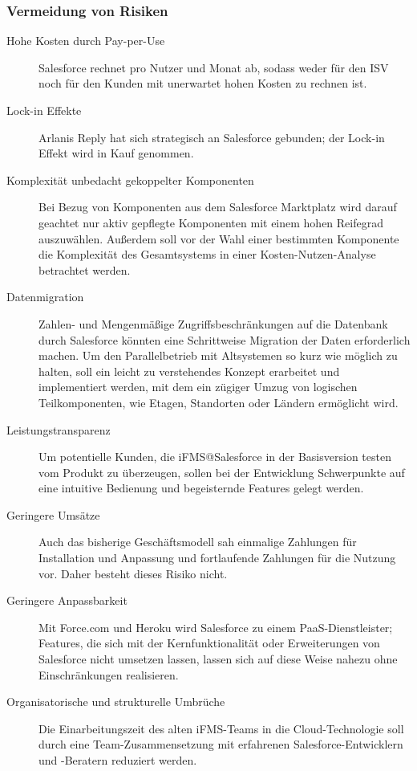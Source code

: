 \subsubsection{Vermeidung von Risiken}
\begin{description}
	\item[Hohe Kosten durch Pay-per-Use] Salesforce rechnet pro Nutzer und 
Monat ab, sodass weder für den ISV noch für den Kunden mit 
unerwartet hohen Kosten zu rechnen ist.
	\item[Lock-in Effekte] Arlanis Reply hat sich strategisch an Salesforce 
gebunden; der Lock-in Effekt wird in Kauf genommen.
	\item[Komplexität unbedacht gekoppelter Komponenten] Bei Bezug 
von Komponenten aus dem Salesforce Marktplatz wird darauf geachtet nur aktiv 
gepflegte Komponenten mit einem hohen Reifegrad auszuwählen. Außerdem soll vor 
der Wahl einer bestimmten Komponente die Komplexität des Gesamtsystems in einer 
Kosten-Nutzen-Analyse betrachtet werden.
	\item[Datenmigration] Zahlen- und Mengenmäßige Zugriffsbeschränkungen 
auf die Datenbank durch Salesforce könnten eine Schrittweise Migration der 
Daten erforderlich machen. Um den Parallelbetrieb mit Altsystemen so kurz wie 
möglich zu halten, soll ein leicht zu verstehendes Konzept erarbeitet und 
implementiert werden, mit dem ein zügiger Umzug von logischen Teilkomponenten, 
wie Etagen, Standorten oder Ländern ermöglicht wird.
	\item[Leistungstransparenz] Um potentielle Kunden, die iFMS@Salesforce 
in der Basisversion testen vom Produkt zu überzeugen, sollen bei der 
Entwicklung Schwerpunkte auf eine intuitive Bedienung und begeisternde Features 
gelegt werden.
	\item[Geringere Umsätze] Auch das bisherige Geschäftsmodell sah 
einmalige Zahlungen für Installation und Anpassung und fortlaufende Zahlungen 
für die Nutzung vor. Daher besteht dieses Risiko nicht. 
	\item[Geringere Anpassbarkeit] Mit Force.com und Heroku wird Salesforce 
zu einem PaaS-Dienstleister; Features, die sich mit der 
Kernfunktionalität oder Erweiterungen von Salesforce nicht umsetzen lassen, 
lassen sich auf diese Weise nahezu ohne Einschränkungen realisieren.
	\item[Organisatorische und strukturelle Umbrüche] Die Einarbeitungszeit 
des alten iFMS-Teams in die Cloud-Technologie soll durch eine 
Team-Zusammensetzung mit erfahrenen Salesforce-Entwicklern und -Beratern 
reduziert werden. \\

\end{description}
